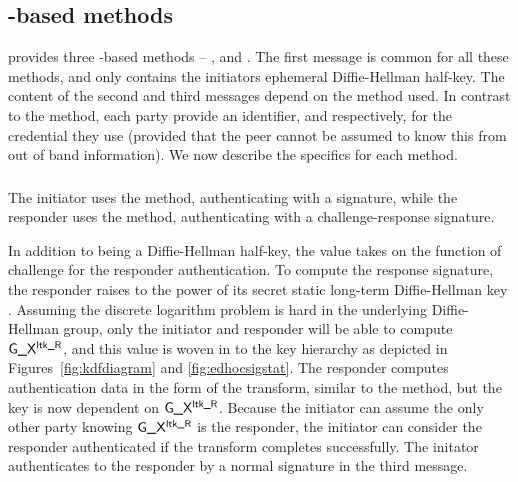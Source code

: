 \subsection{\mStat-based methods}
\mEdhoc{} provides three \mStat-based methods -- \mSigStat{}, \mStatStat{} and
\mStatSig{}.
%
The first message is common for all these methods, and only contains the
initiators ephemeral Diffie-Hellman half-key.
%
The content of the second and third messages depend on the method used.
%
In contrast to the \mPskPsk{} method, each party provide an identifier,
\mIdcredi{} and \mIdcredr{} respectively, for the credential they use (provided
that the peer cannot be assumed to know this from out of band information).
%
We now describe the specifics for each method.
%

\subsubsection{\mSigStat}
The initiator uses the \mSig{} method, authenticating with a signature,
while the responder uses the \mStat{} method, authenticating with a
challenge-response signature.
%

In addition to being a Diffie-Hellman half-key, the value \mGx{} takes on the
function of challenge for the responder authentication.
%
To compute the response signature, the responder raises \mGx{} to the power of
its secret static long-term Diffie-Hellman key \mLtkr{}.
%
Assuming the discrete logarithm problem is hard in the underlying Diffie-Hellman
group, only the initiator and responder will be able to compute
$\text{\textup{\textsf{G\_X}}}{}^{\text{\textup{\textsf{ltk\_R}}}}{}$, and this value is woven in to the key hierarchy as depicted
in Figures~\ref{fig:kdfdiagram} and \ref{fig:edhocsigstat}.
%
The responder computes authentication data in the form of the \mAead{}
transform, similar to the \mPskPsk{} method, but the key is now dependent on
$\text{\textup{\textsf{G\_X}}}{}^{\text{\textup{\textsf{ltk\_R}}}}{}$.
%
Because the initiator can assume the only other party knowing
$\text{\textup{\textsf{G\_X}}}{}^{\text{\textup{\textsf{ltk\_R}}}}{}$ is the responder, the initiator can consider the responder
authenticated if the \mAead{} transform completes successfully.
%
The initator authenticates to the responder by a normal signature in the third
message.
%

